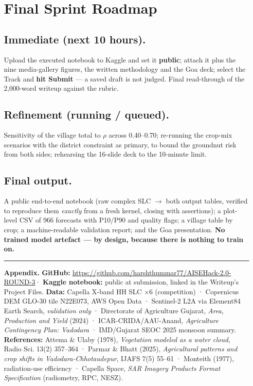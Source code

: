 \documentclass[9pt,a4paper,twocolumn]{extarticle}
\begin{document}
\section{Final Sprint Roadmap}

\subsection{Immediate (next 10 hours).} Upload the executed notebook to Kaggle and set it
\textbf{public}; attach it plus the nine media-gallery figures, the written methodology and the Goa
deck; select the Track and \textbf{hit Submit} — a saved draft is not judged. Final read-through of
the 2{,}000-word writeup against the rubric.

\subsection{Refinement (running / queued).} Sensitivity of the village total to $\rho$ across
0.40–0.70; re-running the crop-mix scenarios with the district constraint as primary, to bound the
groundnut risk from both sides; rehearsing the 16-slide deck to the 10-minute limit.

\subsection{Final output.} A public end-to-end notebook (raw complex SLC $\to$ both output tables,
verified to reproduce them \emph{exactly} from a fresh kernel, closing with assertions); a
plot-level CSV of 966 forecasts with P10/P90 and quality flags; a village table by crop; a
machine-readable validation report; and the Goa presentation. \textbf{No trained model artefact — by
design, because there is nothing to train on.}

\vspace{3pt}
{\color{rule}\rule{\columnwidth}{0.5pt}}

{\fontsize{6.9}{8.2}\selectfont
\textbf{Appendix.} \textbf{GitHub:} \url{https://github.com/harshthummar77/AISEHack-2.0-ROUND-3}\;·\;
\textbf{Kaggle notebook:} public at submission, linked in the Writeup's Project Files.\;
\textbf{Data:} Capella X-band HH SLC $\times$6 (competition) · Copernicus DEM GLO-30 tile N22E073,
AWS Open Data · Sentinel-2 L2A via Element84 Earth Search, \emph{validation only} · Directorate of
Agriculture Gujarat, \emph{Area, Production and Yield} (2024) · ICAR-CRIDA/AAU-Anand, \emph{Agriculture
Contingency Plan: Vadodara} · IMD/Gujarat SEOC 2025 monsoon summary.\;
\textbf{References:} Attema \& Ulaby (1978), \emph{Vegetation modeled as a water cloud}, Radio Sci.
13(2) 357–364 · Parmar \& Bhatt (2025), \emph{Agricultural patterns and crop shifts in
Vadodara-Chhotaudepur}, IJAFS 7(5) 55–61 · Monteith (1977), radiation-use efficiency · Capella Space,
\emph{SAR Imagery Products Format Specification} (radiometry, RPC, NESZ).}
\end{document}
